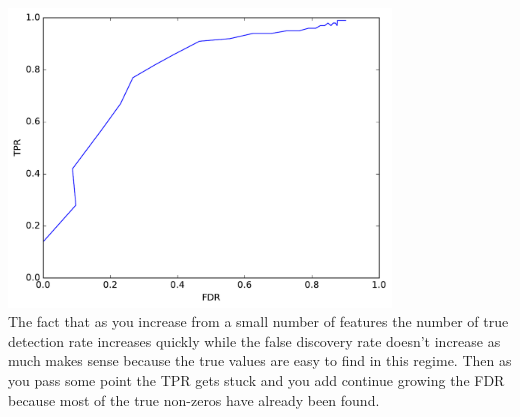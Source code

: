 \documentclass{article}
\newcommand{\1}{\mathbf{1}}
\begin{document}
\includegraphics[width=4in]{FDRvsTPR.pdf}\\
The fact that as you increase from a small number of features the number of true detection rate increases quickly while the false discovery rate doesn't increase as much makes sense because the true values are easy to find in this regime. Then as you pass some point the TPR gets stuck and you add continue growing the FDR because most of the true non-zeros have already been found.\\
\end{document}
